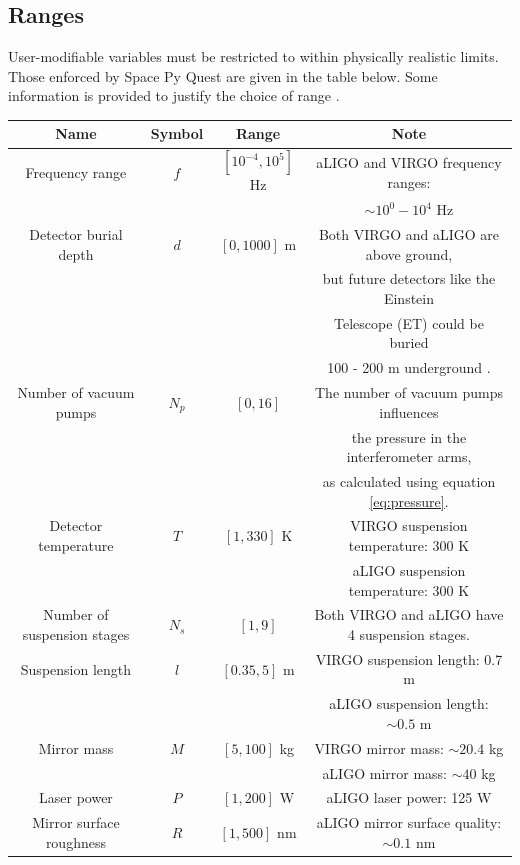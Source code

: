 \documentclass{article}
\begin{document}
\begin{appendix}
\subsection{Ranges}
\label{sec:ranges}
User-modifiable variables must be restricted to within physically
realistic limits. Those enforced by Space Py Quest are given in the
table below. Some information is provided to justify the choice of
range \cite{advLIGO}\cite{VIRGO}.
\begin{center}
    \begin{tabular}{ |c|c|c|c| } 
     \hline
     \textbf{Name} & \textbf{Symbol}  & \textbf{Range} & \textbf{Note}\\     
     \hline
     Frequency range  & $f$ & $[10^{-4}, 10^5]$ Hz & aLIGO and VIRGO frequency ranges: \\ 
     &  &  &  $\sim 10^0 - 10^4$ Hz\\
     \hline
     Detector burial depth & $d$ & $[0, 1000]$ m & Both VIRGO and aLIGO are above ground, \\
     & & & but future detectors like the Einstein \\
     & & & Telescope (ET) could be buried \\ 
     & & & 100 - 200 m underground \cite{ET}.\\ 
     \hline
     Number of vacuum pumps & $N_p$ & $[0, 16]$ &
            The number of vacuum pumps influences \\
     & & &  the pressure in the interferometer arms, \\
     & & & as calculated using equation \ref{eq:pressure}.\\ 
     \hline
     Detector temperature & $T$ & $[1, 330]$ K &
            VIRGO suspension temperature: 300 K\\
     & & & aLIGO suspension temperature: 300 K\\ 
     \hline
     Number of suspension stages & $N_s$ & $[1, 9]$ & 
            Both VIRGO and aLIGO have 4 suspension stages.\\ 
     \hline
    Suspension length & $l$ & $[0.35, 5]$ m &
            VIRGO suspension length: 0.7 m \\
    & & & aLIGO suspension length: $\sim 0.5$ m\\ 
    \hline
    Mirror mass& $M$ & $[5, 100]$ kg &
            VIRGO mirror mass: $\sim 20.4$ kg\\
    & & & aLIGO mirror mass: $\sim 40$ kg\\ 
    \hline
    Laser power & $P$ & $[1, 200]$ W &
            aLIGO laser power: 125 W\\ 
    \hline
    Mirror surface roughness& $R$ & $[1, 500]$ nm &
            aLIGO mirror surface quality: $\sim 0.1$ nm\\ 
    \hline
    \end{tabular}
\end{center}


\end{appendix}
\end{document}

